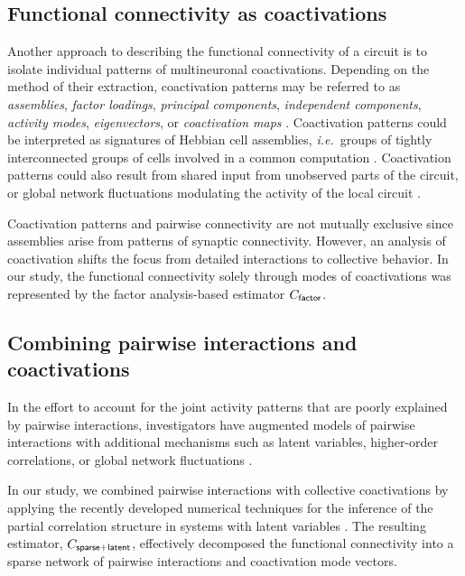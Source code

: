\subsection*{Functional connectivity as coactivations}
Another approach to describing the functional connectivity of a circuit is to isolate individual patterns of multineuronal coactivations. Depending on the method of their extraction, coactivation patterns may be referred to as \emph{assemblies}, \emph{factor loadings}, \emph{principal components}, \emph{independent components}, \emph{activity modes}, \emph{eigenvectors}, or \emph{coactivation maps} \cite{Gerstein:1989, Chapin:1999, Peyrache:2010, Ch:2010, Lopes:2011, Lopes:2013}. Coactivation patterns could be interpreted as signatures of Hebbian cell assemblies, \emph{i.e.}\ groups of tightly interconnected groups of cells involved in a common computation \cite{Gerstein:1989, Ch:2010}.  Coactivation patterns could also result from shared input from unobserved parts of the circuit, or global network fluctuations modulating the activity of the local circuit \cite{Okun:2012, Ecker:2014}.

Coactivation patterns and pairwise connectivity are not mutually exclusive since assemblies arise from patterns of synaptic connectivity.  However, an analysis of coactivation shifts the focus from detailed interactions to  collective behavior.
In our study, the functional connectivity solely through modes of coactivations was represented by the factor analysis-based estimator $C_{\sf factor}$.

\subsection*{Combining pairwise interactions and coactivations}
In the effort to account for the joint activity patterns that are poorly explained by pairwise interactions, investigators have augmented models of pairwise interactions with additional mechanisms such as latent variables, higher-order correlations, or global network fluctuations \cite{Ganmor:2011, Tkacik:2013, Pfau:2013, Koster:2013, Ecker:2014}.

In our study, we combined pairwise interactions with collective coactivations by applying the recently developed numerical techniques for the inference of the partial correlation structure in systems with latent variables \cite{Chandrasekaran:2010, Ma:2013}.  The resulting estimator, $C_{\sf sparse+latent}$, effectively decomposed the functional connectivity into a sparse network of pairwise interactions and coactivation mode vectors.

